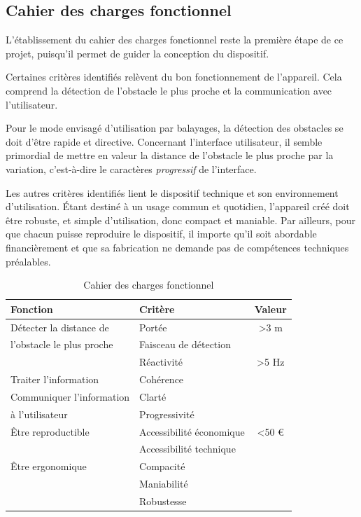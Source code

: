 \documentclass[a4paper, 11pt]{article}
\begin{document}
\subsection{Cahier des charges fonctionnel}

\par L'établissement du cahier des charges fonctionnel reste la première étape de ce projet, puisqu'il permet de guider la conception du dispositif.

\par Certaines critères identifiés relèvent du bon fonctionnement de l'appareil. Cela comprend la détection de l'obstacle le plus proche et la communication avec l'utilisateur.

\par Pour le mode envisagé d'utilisation par balayages, la détection des obstacles se doit d'être rapide et directive. Concernant l'interface utilisateur, il semble primordial de mettre en valeur la distance de l'obstacle le plus proche par la variation, c'est-à-dire le caractères \textit{progressif} de l'interface.

\par Les autres critères identifiés lient le dispositif technique et son environnement d'utilisation. Étant destiné à un usage commun et quotidien, l'appareil créé doit être robuste, et simple d'utilisation, donc compact et maniable. Par ailleurs, pour que chacun puisse reproduire le dispositif, il importe qu'il soit abordable financièrement et que sa fabrication ne demande pas de compétences techniques préalables.

\bigskip

\begin{table}[h!]
\centering
\begin{tabular}{llc}
\hline
{\bf Fonction} & {\bf Critère} & {\bf Valeur} \\
\hline
Détecter la distance de & Portée & \textgreater 3 m \\
l'obstacle le plus proche & Faisceau de détection & \\
 & Réactivité & \textgreater 5 Hz \\
\hline
Traiter l'information & Cohérence & \\
\hline
Communiquer l'information & Clarté & \\
à l'utilisateur & Progressivité & \\
\hline
Être reproductible & Accessibilité économique & \textless 50 € \\
 & Accessibilité technique & \\
\hline
Être ergonomique & Compacité & \\
 & Maniabilité & \\
 & Robustesse & \\
\hline
\end{tabular}
\caption{Cahier des charges fonctionnel}
\end{table}
\end{document}
